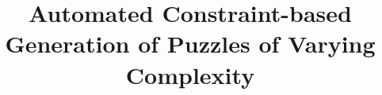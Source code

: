 \documentclass[12pt]{article}
\begin{document}
\doublespacing

\title{Automated Constraint-based Generation of Puzzles of Varying Complexity}

\maketitle
\end{document}
